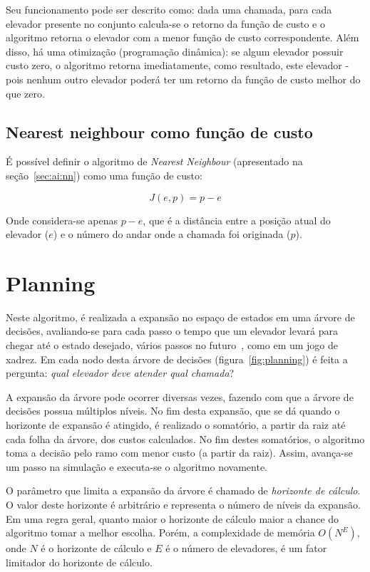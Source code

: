 Seu funcionamento pode ser descrito como: dada uma chamada, para cada elevador
presente no conjunto calcula-se o retorno da função de custo e o algoritmo
retorna o elevador com a menor função de custo correspondente. Além disso, há
uma otimização (programação dinâmica): se algum elevador possuir custo zero, o
algoritmo retorna imediatamente, como resultado, este elevador - pois nenhum
outro elevador poderá ter um retorno da função de custo melhor do que zero.

\subsection{Nearest neighbour como função de custo}

É possível definir o algoritmo de \textit{Nearest Neighbour} (apresentado na
seção~\ref{sec:ai:nn}) como uma função de custo:

\[J(e, p) = p - e\]

Onde considera-se apenas $p - e$, que é a distância entre a posição atual do
elevador ($e$) e o número do andar onde a chamada foi originada ($p$).

\section{\label{sec:ai:planning}Planning}

Neste algoritmo, é realizada a expansão no espaço de estados em uma árvore de
decisões, avaliando-se para cada passo o tempo que um elevador levará para
chegar até o estado desejado, vários passos no
futuro~\cite{Koehler00elevatorcontrol}, como em um jogo de xadrez. Em cada nodo
desta árvore de decisões (figura~\ref{fig:planning}) é feita a pergunta:
\textit{qual elevador deve atender qual chamada}?

A expansão da árvore pode ocorrer diversas vezes, fazendo com que a árvore de
decisões possua múltiplos níveis. No fim desta expansão, que se dá quando
o horizonte de expansão é atingido, é realizado o somatório, a partir da raiz até
cada folha da árvore, dos custos calculados. No fim destes somatórios, o
algoritmo toma a decisão pelo ramo com menor custo (a partir da raiz). Assim,
avança-se um passo na simulação e executa-se o algoritmo novamente.

O parâmetro que limita a expansão da árvore é chamado de \textit{horizonte de
cálculo}. O valor deste horizonte é arbitrário e representa o número de níveis
da expansão. Em uma regra geral, quanto maior o horizonte de cálculo maior a
chance do algoritmo tomar a melhor escolha. Porém, a complexidade de memória
$O(N^{E})$, onde $N$ é o horizonte de cálculo e $E$ é o número de elevadores,
é um fator limitador do horizonte de cálculo.

